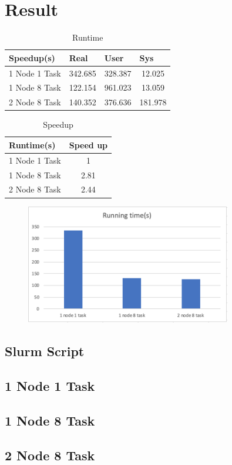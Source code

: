 \documentclass[11pt]{article}
\begin{document}
\section{Result}

\begin{table}[]
\begin{tabular}{c|ccc}
\multicolumn{1}{l|}{Speedup(s)} & \multicolumn{1}{l}{Real} & \multicolumn{1}{l}{User} & \multicolumn{1}{l}{Sys} \\ \hline
1 Node 1 Task                   & 342.685                  & 328.387                  & 12.025                  \\ \hline
1 Node 8 Task                   & 122.154                  & 961.023                  & 13.059                  \\ \hline
2 Node 8 Task                   & 140.352                  & 376.636                  & 181.978
\end{tabular}
\caption{Runtime}
\label{Runtime}
\end{table}

\begin{table}[]
\begin{tabular}{c|c}
\multicolumn{1}{l|}{Runtime(s)} & \multicolumn{1}{l}{Speed up} \\ \hline
1 Node 1 Task                   & 1                            \\
1 Node 8 Task                   & 2.81                         \\
2 Node 8 Task                   & 2.44
\end{tabular}
\caption{Speedup}
\label{Speedup}
\end{table}
\begin{figure}[h]
\includegraphics[width=0.8\textwidth]{runtime_new}
\end{figure}





\begin{appendices}
\appendixpage
\section{Slurm Script}
\subsection{1 Node 1 Task}

\subsection{1 Node 8 Task}

\subsection{2 Node 8 Task}

\end{appendices}
\end{document}
